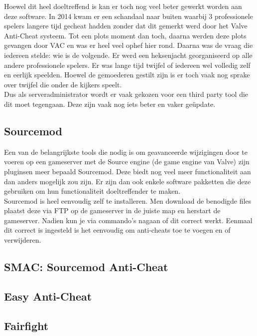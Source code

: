 \documentclass[pdftex,a4paper,12pt,twoside]{report}
\begin{document}
Hoewel dit heel doeltreffend is kan er toch nog veel beter gewerkt worden aan deze software. In 2014 kwam er een schandaal naar buiten waarbij 3 professionele spelers langere tijd gecheat hadden zonder dat dit gemerkt werd door het Valve Anti-Cheat systeem. Tot een plots moment dan toch, daarna werden deze plots gevangen door VAC en was er heel veel ophef hier rond. Daarna was de vraag die iedereen stelde: wie is de volgende. Er werd een heksenjacht georganiseerd op alle andere professionele spelers. Er was lange tijd twijfel of iedereen wel volledig zelf en eerlijk speelden. Hoewel de gemoederen gestilt zijn is er toch vaak nog sprake over twijfel die onder de kijkers speelt. \citep{pcgamerhackingscandal}
\\

Dus als serveradministrator wordt er vaak gekozen voor een third party tool die dit moet tegengaan. Deze zijn vaak nog iets beter en vaker geüpdate. 


\subsection{Sourcemod}
\label{sec:sourcemod}
Een van de belangrijkste tools die nodig is om geavanceerde wijzigingen door te voeren op een gameserver met de Source engine (de game engine van Valve) zijn pluginsen meer bepaald Sourcemod. Deze biedt nog veel meer functionaliteit aan dan anders mogelijk zou zijn. Er zijn dan ook enkele software pakketten die deze gebruiken om hun functionaliteit doeltreffender te maken. 
\\

Sourcemod is heel eenvoudig zelf te installeren. Men download de benodigde files plaatst deze via FTP op de gameserver in de juiste map en herstart de gameserver. Nadien kun je via commando's nagaan of dit correct werkt. Eenmaal dit correct is ingesteld is het eenvoudig om anti-cheats toe te voegen en of verwijderen. 

\subsection{SMAC: Sourcemod Anti-Cheat}
\label{sec:smac}


\subsection{Easy Anti-Cheat}
\label{sec:easy}

\subsection{Fairfight}
\label{sec:fairfight}
\end{document}
